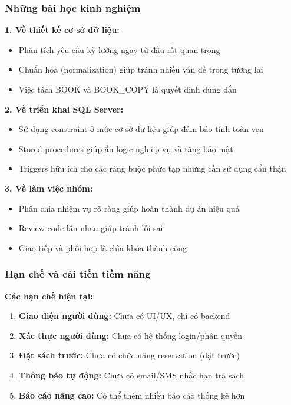 \documentclass[12pt,a4paper]{article}
\begin{document}
\subsubsection{Những bài học kinh nghiệm}

\textbf{1. Về thiết kế cơ sở dữ liệu:}
\begin{itemize}
    \item Phân tích yêu cầu kỹ lưỡng ngay từ đầu rất quan trọng
    \item Chuẩn hóa (normalization) giúp tránh nhiều vấn đề trong tương lai
    \item Việc tách BOOK và BOOK\_COPY là quyết định đúng đắn
\end{itemize}

\textbf{2. Về triển khai SQL Server:}
\begin{itemize}
    \item Sử dụng constraint ở mức cơ sở dữ liệu giúp đảm bảo tính toàn vẹn
    \item Stored procedures giúp ẩn logic nghiệp vụ và tăng bảo mật
    \item Triggers hữu ích cho các ràng buộc phức tạp nhưng cần sử dụng cẩn thận
\end{itemize}

\textbf{3. Về làm việc nhóm:}
\begin{itemize}
    \item Phân chia nhiệm vụ rõ ràng giúp hoàn thành dự án hiệu quả
    \item Review code lẫn nhau giúp tránh lỗi sai
    \item Giao tiếp và phối hợp là chìa khóa thành công
\end{itemize}

\subsubsection{Hạn chế và cải tiến tiềm năng}

\textbf{Các hạn chế hiện tại:}
\begin{enumerate}
    \item \textbf{Giao diện người dùng:} Chưa có UI/UX, chỉ có backend
    \item \textbf{Xác thực người dùng:} Chưa có hệ thống login/phân quyền
    \item \textbf{Đặt sách trước:} Chưa có chức năng reservation (đặt trước)
    \item \textbf{Thông báo tự động:} Chưa có email/SMS nhắc hạn trả sách
    \item \textbf{Báo cáo nâng cao:} Có thể thêm nhiều báo cáo thống kê hơn
\end{enumerate}
\end{document}
